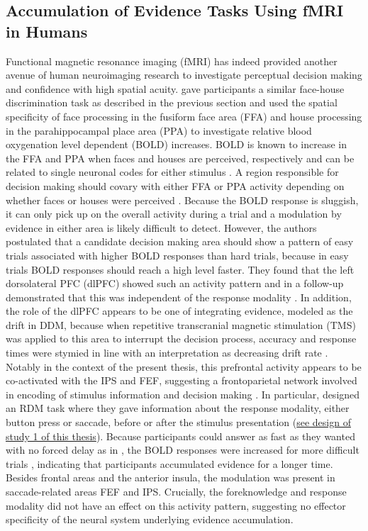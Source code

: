 \subsection{Accumulation of Evidence Tasks Using fMRI in Humans}
Functional magnetic resonance imaging (fMRI) has indeed provided another avenue of human neuroimaging research to investigate perceptual decision making and confidence with high spatial acuity. \textcite{Heekeren2004} gave participants a similar face-house discrimination task as described in the previous section \parencite{Philiastides2014} and used the spatial specificity of face processing in the fusiform face area (FFA) and house processing in the parahippocampal place area (PPA) to investigate relative blood oxygenation level dependent (BOLD) increases. BOLD is known to increase in the FFA and PPA when faces and houses are perceived, respectively and can be related to single neuronal codes for either stimulus \parencite{Epstein1998,Haxby2000,Ishai1999,Kanwisher1997,Logothetis2001,Logothetis2004,McCarthy1997}. A region responsible for decision making should covary with either FFA or PPA activity depending on whether faces or houses were perceived \parencite{Heekeren2004}. Because the BOLD response is sluggish, it can only pick up on the overall activity during a trial and a modulation by evidence in either area is likely difficult to detect. However, the authors postulated that a candidate decision making area should show a pattern of easy trials associated with higher BOLD responses than hard trials, because in easy trials BOLD responses should reach a high level faster. They found that the left dorsolateral PFC (dlPFC) showed such an activity pattern and in a follow-up demonstrated that this was independent of the response modality \parencite{Heekeren2006}. In addition, the role of the dlPFC appears to be one of integrating evidence, modeled as the drift in DDM, because when repetitive transcranial magnetic stimulation (TMS) was applied to this area to interrupt the decision process, accuracy and response times were stymied in line with an interpretation as decreasing drift rate \parencite{Philiastides2011}. Notably in the context of the present thesis, this prefrontal activity appears to be co-activated with the IPS and FEF, suggesting a frontoparietal network involved in encoding of stimulus information and decision making \parencite{Heekeren2006,Ho2009,Kayser2010,Liu2011}. In particular, \textcite{Liu2011} designed an RDM task where they gave information about the response modality, either button press or saccade, before or after the stimulus presentation (\href{https://doi.org/10.3389/fnhum.2017.00576}{see design of study 1 of this thesis}). Because participants could answer as fast as they wanted with no forced delay as in \textcite{Heekeren2004}, the BOLD responses were increased for more difficult trials \parencite{Hanks2017}, indicating that participants accumulated evidence for a longer time. Besides frontal areas and the anterior insula, the modulation was present in saccade-related areas FEF and IPS. Crucially, the foreknowledge and response modality did not have an effect on this activity pattern, suggesting no effector specificity of the neural system underlying evidence accumulation. 